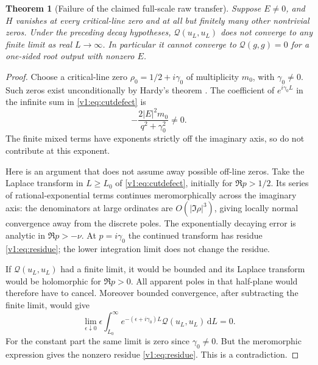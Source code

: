 \documentclass[11pt]{article}
\newtheorem{theorem}{Theorem}[section]
\theoremstyle{remark}
\newcommand{\Q}{\mathcal Q}
\newcommand{\dd}{\mathrm d}
\begin{document}
\begin{theorem}[Failure of the claimed full-scale raw transfer]\label{v1:thm:rawfailure}
Suppose $E\ne0$, and $H$ vanishes at every critical-line zero and at all
but finitely many other nontrivial zeros. Under the preceding decay
hypotheses, $\Q(u_L,u_L)$ does not converge to any finite limit as real
$L\to\infty$. In particular it cannot converge to $\Q(g,g)=0$ for a
one-sided root output with nonzero $E$.
\end{theorem}
\begin{proof}
Choose a critical-line zero $\rho_0=1/2+i\gamma_0$ of multiplicity $m_0$,
with $\gamma_0\ne0$. Such zeros exist unconditionally by Hardy's theorem
\cite{Hardy}. The coefficient of $e^{i\gamma_0L}$ in the infinite sum
in \eqref{v1:eq:cutdefect} is
\begin{equation}\label{v1:eq:residue}
 -\frac{2|E|^2m_0}{q^2+\gamma_0^2}\ne0.
\end{equation}
The finite mixed terms have exponents strictly off the imaginary axis,
so do not contribute at this exponent.

Here is an argument that does not assume away possible off-line zeros.
Take the Laplace transform in $L\ge L_0$ of \eqref{v1:eq:cutdefect}, initially
for $\Re p>1/2$. Its series of rational-exponential terms continues
meromorphically across the imaginary axis: the denominators at large
ordinates are $O(|\Im\rho|^3)$, giving locally normal convergence away
from the discrete poles. The exponentially decaying error is analytic
in $\Re p>-\nu$. At $p=i\gamma_0$ the continued transform has residue
\eqref{v1:eq:residue}; the lower integration limit does not change the residue.

If $\Q(u_L,u_L)$ had a finite limit, it would be bounded and its Laplace
transform would be holomorphic for $\Re p>0$. All apparent poles in that
half-plane would therefore have to cancel. Moreover bounded convergence,
after subtracting the finite limit, would give
\[
 \lim_{\epsilon\downarrow0}\epsilon
 \int_{L_0}^\infty e^{-(\epsilon+i\gamma_0)L}
           \Q(u_L,u_L)\,\dd L=0.
\]
For the constant part the same limit is zero since $\gamma_0\ne0$.
But the meromorphic expression gives the nonzero residue
\eqref{v1:eq:residue}. This is a contradiction.
\end{proof}
\end{document}

